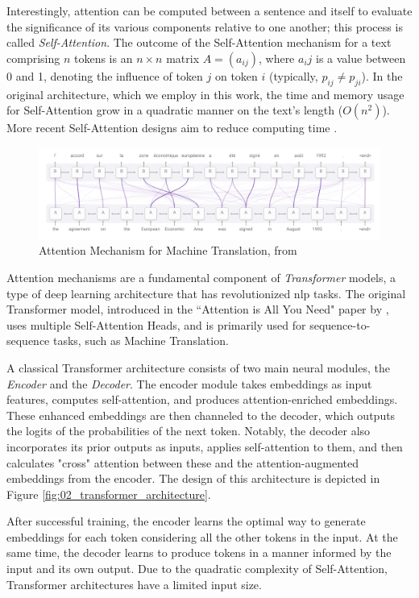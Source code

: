 Interestingly, attention can be computed between a sentence and itself to evaluate the significance of its various components relative to one another; this process is called \emph{Self-Attention}. The outcome of the Self-Attention mechanism for a text comprising $n$ tokens is an $n\times n$ matrix $A=(a_{ij})$, where $a_ij$ is a value between 0 and 1, denoting the influence of token $j$ on token $i$ (typically, $p_{ij}\neq p_{ji}$). In the original architecture, which we employ in this work, the time and memory usage for Self-Attention grow in a quadratic manner on the text's length ($O(n^2)$). More recent Self-Attention designs aim to reduce computing time \cite{flash_attention}.


\begin{figure}
    \centering
    \includegraphics[width=.75\textwidth]{Figures/02/Attention_for_translation.png}
    \caption{Attention Mechanism for Machine Translation, from }
    \label{fig:02_attention_for_translation}
\end{figure}


Attention mechanisms are a fundamental component of \emph{Transformer} models, a type of deep learning architecture that has revolutionized \gls{nlp} tasks. The original Transformer model, introduced in the ``Attention is All You Need" paper by \cite{attention_is_all_you_need}, uses multiple Self-Attention Heads, and is primarily used for sequence-to-sequence tasks, such as Machine Translation.

A classical Transformer architecture consists of two main neural modules, the \emph{Encoder} and the \emph{Decoder}. The encoder module takes embeddings as input features, computes self-attention, and produces attention-enriched embeddings.
These enhanced embeddings are then channeled to the decoder, which outputs the logits of the probabilities of the next token.
Notably, the decoder also incorporates its prior outputs as inputs, applies self-attention to them, and then calculates "cross" attention between these and the attention-augmented embeddings from the encoder. The design of this architecture is depicted in Figure \ref{fig:02_transformer_architecture}.

After successful training, the encoder learns the optimal way to generate embeddings for each token considering all the other tokens in the input. At the same time, the decoder learns to produce tokens in a manner informed by the input and its own output. Due to the quadratic complexity of Self-Attention, Transformer architectures have a limited input size.


